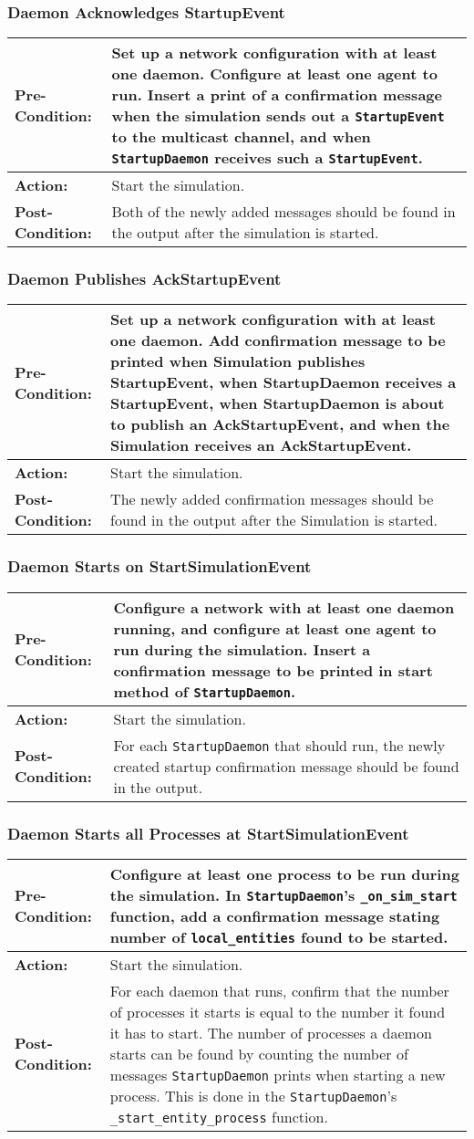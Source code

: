 \documentclass[titlepage]{article}
\newcommand{\testcase}[3]{
    \begin{center}
    \begin{tabular}{| l | p{0.7\textwidth}|}
        \hline
        \rowcolor[gray]{0.8}\textbf{Pre-Condition:} & #1 \\ \hline
        \textbf{Action:} & #2 \\ \hline
        \rowcolor[gray]{0.8}\textbf{Post-Condition:} & #3 \\ \hline
    \end{tabular}
    \end{center}
}
\begin{document}
\subsubsection{Daemon Acknowledges StartupEvent}
\testcase{Set up a network configuration with at least one daemon.  Configure at least one agent to run.  Insert a print of a confirmation message when the simulation sends out a \texttt{StartupEvent} to the multicast channel, and when \texttt{StartupDaemon} receives such a \texttt{StartupEvent}.}{Start the simulation.}{Both of the newly added messages should be found in the output after the simulation is started.}

\subsubsection{Daemon Publishes AckStartupEvent}
\testcase{Set up a network configuration with at least one daemon.  Add confirmation message to be printed when Simulation publishes StartupEvent, when StartupDaemon receives a StartupEvent, when StartupDaemon is about to publish an AckStartupEvent, and when the Simulation receives an AckStartupEvent.}{Start the simulation.}{The newly added confirmation messages should be found in the output after the Simulation is started.}

\subsubsection{Daemon Starts on StartSimulationEvent}
\testcase{Configure a network with at least one daemon running, and configure at least one agent to run during the simulation.  Insert a confirmation message to be printed in start method of \texttt{StartupDaemon}.}{Start the simulation.}{For each \texttt{StartupDaemon} that should run, the newly created startup confirmation message should be found in the output.}

\subsubsection{Daemon Starts all Processes at StartSimulationEvent}
\testcase{Configure at least one process to be run during the simulation.  In \texttt{StartupDaemon}'s \texttt{\_on\_sim\_start} function, add a confirmation message stating number of \texttt{local\_entities} found to be started.}{Start the simulation.}{For each daemon that runs, confirm that the number of processes it starts is equal to the number it found it has to start.  The number of processes a daemon starts can be found by counting the number of messages \texttt{StartupDaemon} prints when starting a new process.  This is done in the \texttt{StartupDaemon}'s \texttt{\_start\_entity\_process} function.}
\end{document}
